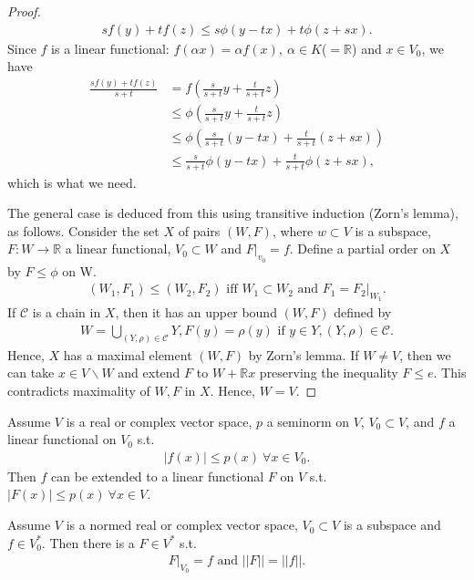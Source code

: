 \begin{proof}
\begin{align*}
    sf(y) + tf(z) \leq s\phi(y-tx) + t\phi(z+sx).
\end{align*}
Since \(f\) is a linear functional: \(f(\alpha x) = \alpha f(x), \ \alpha\in K\)(\(=\mathbb{R}\)) and \(x\in V_{0}\), we have
\begin{align*}
    \frac{sf(y) +tf(z)}{s+t} &= f\left(\frac{s}{s+t}y + \frac{t}{s+t}z\right) \\
    &\leq \phi\left(\frac{s}{s+t}y + \frac{t}{s+t}z\right) \\
    &\leq \phi\left(\frac{s}{s+t}(y-tx) + \frac{t}{s+t}(z+sx)\right) \\
    &\leq \frac{s}{s+t}\phi\left(y-tx\right) + \frac{t}{s+t}\phi\left(z+sx\right),
\end{align*}
which is what we need. 

The general case is deduced from this using transitive induction (Zorn's lemma), as follows. Consider the set \(X\) of pairs \((W,F)\), 
where \(w\subset V\) is a subspace, \(F:W\rightarrow \mathbb{R}\) a linear functional, \(V_0\subset W\) and \(F\vert_{v_0} = f\). Define
a partial order on \(X\) by \(F\leq \phi\) on W. 
\begin{align*}
    (W_1, F_1) \leq (W_2, F_2) \text{ iff } W_1\subset W_2\text{ and } F_1=F_2\vert_{W_1}.
\end{align*}
If \(\mathcal{C}\) is a chain in \(X\), then it has an upper bound \((W,F)\) defined by
\begin{align*}
    W = \bigcup\limits_{(Y,\rho)\in\mathcal{C}} Y, F(y) = \rho(y) \text{ if } y\in Y, (Y,\rho) \in\mathcal{C}.
\end{align*}
Hence, \(X\) has a maximal element \((W,F)\) by Zorn's lemma. If \(W\neq V\), then we can take \(x\in V\backslash W\) and extend \(F\) to
\(W+\mathbb{R}x\) preserving the inequality \(F\leq e\). This contradicts maximality of \(W,F\) in \(X\). Hence, \(W=V\).
\end{proof}
\fi 
\begin{theorem}
    Assume \(V\) is a real or complex vector space, \(p\) a seminorm on \(V\), \(V_0\subset V\), and \(f\) a linear functional on \(V_0\) s.t.
    \begin{align*}
        |f(x)|\leq p(x) \ \forall x\in V_0.
    \end{align*}
    Then \(f\) can be extended to a linear functional \(F\) on \(V\) s.t. \(|F(x)|\leq p(x) \ \forall x\in V\).
\end{theorem}
\begin{corollary}
    Assume \(V\) is a normed real or complex vector space, \(V_0\subset V\) is a subspace and \(f\in V_{0}^{*}\). Then there is a \(F\in V^*\) s.t. 
    \begin{align*}
        F\vert_{V_0} = f \text{ and } ||F|| = ||f||.
    \end{align*}
\end{corollary}
